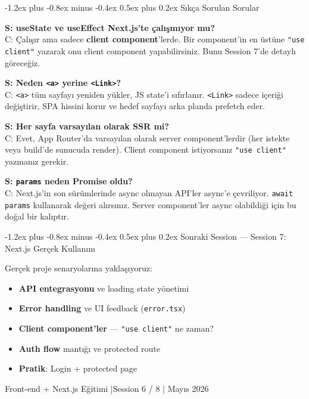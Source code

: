 \documentclass[12pt, a4paper]{article}
\makeatletter
\renewcommand{\subsection}{%
  \@startsection{subsection}{2}{\z@}%
    {-1.2ex plus -0.8ex minus -0.4ex}%
    {0.5ex plus 0.2ex}%
    {\normalfont\large\bfseries\sffamily\color{secondary}}%
}
\makeatother
\begin{document}
\vspace{6pt}

\subsection{Sıkça Sorulan Sorular}

\begin{warningbox}
\textbf{S: useState ve useEffect Next.js'te çalışmıyor mu?}\\
C: Çalışır ama sadece \textbf{client component}'lerde. Bir component'in
en üstüne \texttt{"use client"} yazarak onu client component yapabilirsiniz.
Bunu Session 7'de detaylı göreceğiz.

\vspace{6pt}
\textbf{S: Neden \texttt{<a>} yerine \texttt{<Link>}?}\\
C: \texttt{<a>} tüm sayfayı yeniden yükler, JS state'i sıfırlanır.
\texttt{<Link>} sadece içeriği değiştirir, SPA hissini korur ve hedef
sayfayı arka planda prefetch eder.

\vspace{6pt}
\textbf{S: Her sayfa varsayılan olarak SSR mi?}\\
C: Evet, App Router'da varsayılan olarak server component'lerdir
(her istekte veya build'de sunucuda render). Client component
istiyorsanız \texttt{"use client"} yazmanız gerekir.

\vspace{6pt}
\textbf{S: \texttt{params} neden Promise oldu?}\\
C: Next.js'in son sürümlerinde async olmayan API'ler async'e
çevriliyor. \texttt{await params} kullanarak değeri alırsınız.
Server component'ler async olabildiği için bu doğal bir kalıptır.
\end{warningbox}

\vspace{6pt}

\subsection{Sonraki Session --- Session 7: Next.js Gerçek Kullanım}

\begin{infobox}
Gerçek proje senaryolarına yaklaşıyoruz:
\begin{itemize}
  \item \textbf{API entegrasyonu} ve loading state yönetimi
  \item \textbf{Error handling} ve UI feedback (\texttt{error.tsx})
  \item \textbf{Client component'ler} --- \texttt{"use client"} ne zaman?
  \item \textbf{Auth flow} mantığı ve protected route
  \item \textbf{Pratik}: Login + protected page
\end{itemize}
\end{infobox}

\vspace{16pt}
\begin{center}
  \color{gray}\sffamily\small
  Front-end + Next.js Eğitimi \quad|\quad Session 6 / 8 \quad| Mayıs 2026
\end{center}
\end{document}
